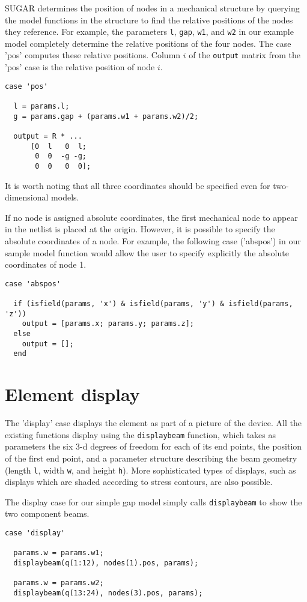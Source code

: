 SUGAR determines the position of nodes in a mechanical structure by
querying the model functions in the structure to find the relative
positions of the nodes they reference.  For example, the parameters
\texttt{l}, \texttt{gap}, \texttt{w1}, and \texttt{w2} in our example
model completely determine the relative positions of the four nodes.
The case 'pos' computes these relative positions.  Column $i$ of the
\texttt{output} matrix from the 'pos' case is the relative position
of node $i$.
\begin{verbatim}
case 'pos'

  l = params.l;
  g = params.gap + (params.w1 + params.w2)/2;

  output = R * ...
      [0  l   0  l;
       0  0  -g -g;
       0  0   0  0];

\end{verbatim}
It is worth noting that all three coordinates should be specified even
for two-dimensional models.

If no node is assigned absolute coordinates, the first mechanical node
to appear in the netlist is placed at the origin.  However, it is possible 
to specify the absolute coordinates of a node.  For example, the following
case ('abspos') in our sample model function would allow the user to specify
explicitly the absolute coordinates of node 1.
\begin{verbatim}
case 'abspos'

  if (isfield(params, 'x') & isfield(params, 'y') & isfield(params, 'z'))
    output = [params.x; params.y; params.z];
  else
    output = [];
  end

\end{verbatim}

\section{Element display}

The 'display' case displays the element as part of a picture of the device.
All the existing functions display using the \texttt{displaybeam} function,
which takes as parameters the six 3-d degrees of freedom for each of its
end points, the position of the first end point, and a parameter structure
describing the beam geometry (length \texttt{l}, width \texttt{w}, and
height \texttt{h}).  More sophisticated types of displays, such as displays
which are shaded according to stress contours, are also possible.

The display case for our simple gap model simply calls \texttt{displaybeam}
to show the two component beams.
\begin{verbatim}
case 'display'

  params.w = params.w1;
  displaybeam(q(1:12), nodes(1).pos, params);

  params.w = params.w2;
  displaybeam(q(13:24), nodes(3).pos, params);

\end{verbatim}

